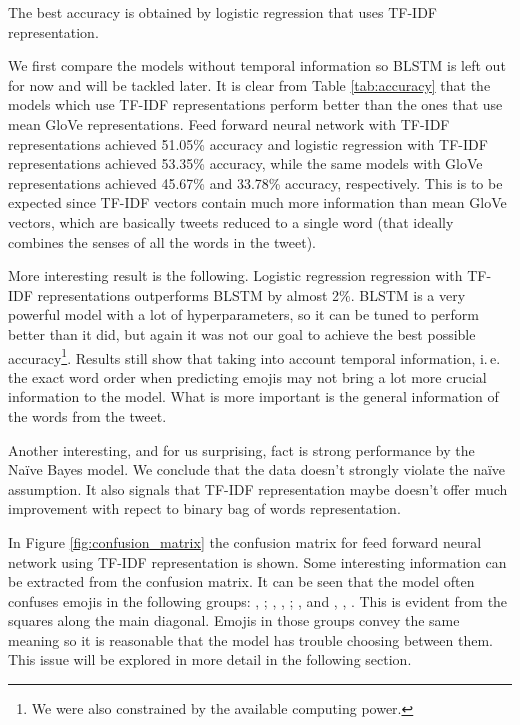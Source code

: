 \documentclass[10pt, a4paper]{article}
\begin{document}
The best accuracy is obtained by logistic regression that uses TF-IDF 
representation.

We first compare the models without temporal information so BLSTM is left out 
for now and will be tackled later. It is clear from Table \ref{tab:accuracy} 
that the models which use TF-IDF representations perform better than the ones 
that use mean GloVe representations. Feed forward neural network with TF-IDF 
representations achieved 51.05\% accuracy and logistic regression with TF-IDF 
representations achieved 53.35\% accuracy, while the same models with GloVe 
representations achieved 45.67\% and 33.78\% accuracy, respectively. This is to 
be expected since TF-IDF vectors contain much more information than mean GloVe 
vectors, which are basically tweets reduced to a single word (that ideally
combines the senses of all the words in the tweet).

More interesting result is the following. Logistic regression regression with 
TF-IDF representations outperforms BLSTM by almost 2\%. BLSTM is a very powerful
model with a lot of hyperparameters, so it can be tuned to perform better than 
it did, but again it was not our goal to achieve the best possible 
accuracy\footnote{We were also constrained by the available computing power.}.
Results still show that taking into account temporal information, i.\,e. the 
exact word order when predicting emojis may not bring a lot more crucial 
information to the model. What is more important is the general information of 
the words from the tweet.

Another interesting, and for us surprising, fact is strong performance by the 
Na\"ive Bayes model. We conclude that the data doesn't strongly violate the 
na\"ive assumption. It also signals that TF-IDF representation maybe doesn't 
offer much improvement with repect to binary bag of words representation.

In Figure \ref{fig:confusion_matrix} the confusion matrix for feed forward 
neural network using TF-IDF representation is shown. Some interesting 
information can be extracted from the confusion matrix. It can be seen that the
model often confuses emojis in the following groups: , 
; , , ; ,
 and , , . This is evident 
from the squares along the main diagonal. Emojis in those groups convey the same
meaning so it is reasonable that the model has trouble choosing between them. 
This issue will be explored in more detail in the following section.
    
\end{document}
